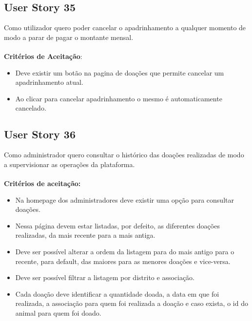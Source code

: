 \documentclass[a4paper,11pt]{article}
\begin{document}
\subsection*{User Story 35}
Como utilizador quero poder cancelar o apadrinhamento a qualquer momento de modo a parar de pagar o montante mensal.\\\\
\textbf{Critérios de Aceitação}:
\begin{itemize}
  \item Deve existir um botão na pagina de doações que permite cancelar um apadrinhamento atual.
  \item Ao clicar para cancelar apadrinhamento o mesmo é automaticamente cancelado.
\end{itemize}

\subsection*{User Story 36}
Como administrador quero consultar o histórico das doações realizadas de modo a supervisionar as operações da plataforma.\\\\
\textbf{Critérios de aceitação:}
\begin{itemize}
    \item Na homepage dos administradores deve existir uma opção para consultar doações.
    \item Nessa página devem estar listadas, por defeito, as diferentes doações realizadas, da mais recente para a mais antiga.
    \item Deve ser possível alterar a ordem da listagem para do mais antigo para o recente, para default, das maiores para as menores doações e vice-versa.
    \item Deve ser possível filtrar a listagem por distrito e associação.
    \item Cada doação deve identificar a quantidade doada, a data em que foi realizada, a associação para quem foi realizada a doação e caso exista, o id do animal para quem foi doado.
\end{itemize}
\end{document}
